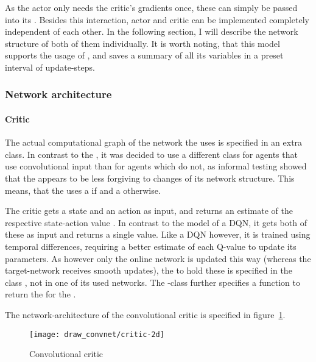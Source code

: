 As the actor only needs the critic's gradients once, these can simply be passed into its . Besides this interaction, actor and critic can be implemented completely independent of each other. In the following section, I will describe the network structure of both of them individually. It is worth noting, that this model supports the usage of , and saves a summary of all its variables in a preset interval of update-steps.

\subsubsection{Network architecture}

\paragraph{Critic}

The actual computational graph of the network the  uses is specified in an extra class. In contrast to the , it was decided to use a different class for agents that use convolutional input than for agents which do not, as informal testing showed that the  appears to be less forgiving to changes of its network structure. This means, that the  uses a  if  and a  otherwise.

The critic gets a state and an action as input, and returns an estimate of the respective state-action value . In contrast to the model of a DQN, it gets both of these as input and returns a single value. Like a DQN however, it is trained using temporal differences, requiring a better estimate of each Q-value to update its parameters. As however only the online network is updated this way (whereas the target-network receives smooth updates), the  to hold these is specified in the class , not in one of its used networks. The -class further specifies a function to return the  for the .

The network-architecture of the convolutional critic is specified in figure~\ref{fig:2dcrit}. 

\begin{figure}[h]
	\centering 
	\texttt{[image: draw\_convnet/critic-2d]}
	\caption{Convolutional critic}
	\label{fig:2dcrit}
\end{figure}

